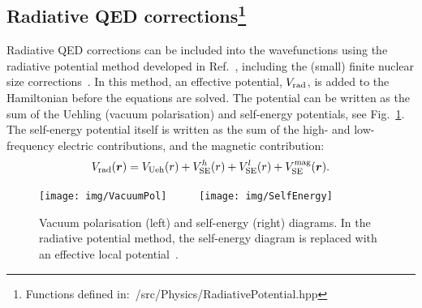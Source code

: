 \documentclass[10pt,twocolumn,a4paper]{article}%
\renewcommand{\v}[1]{\ensuremath{\boldsymbol{#1}}}		%
\newcommand{\be}{\begin{equation}}
\newcommand{\ee}{\end{equation}}
\begin{document}



\subsection[Radiative QED corrections]{Radiative QED corrections\footnote{Functions defined in:~/src/Physics/RadiativePotential.hpp}}

Radiative QED corrections can be included into the wavefunctions using the radiative potential method developed in Ref.~\cite{FlambaumQED2005}, including the (small) finite nuclear size corrections~\cite{GingesQED2015,Ginges2016}.
In this method, an effective potential, $V_{\rm rad}$,
is added to the Hamiltonian before the equations are solved.
The potential can be written as the sum of the Uehling (vacuum polarisation) and self-energy potentials, see Fig.~\ref{fig:QED}.
The self-energy potential itself is written as the sum of the high- and low-frequency electric contributions, and the magnetic contribution:
\be\label{eq:Vrad}
V_{\rm rad}(\v{r}) = V_{\rm Ueh}(r) + V_{\rm SE}^{h}(r) +  V_{\rm SE}^{l}(r) + V_{\rm SE}^{\rm mag}(\v{r}).
\ee



\begin{figure}%
\centering\tiny
\texttt{[image: img/VacuumPol]}~~~~~
\texttt{[image: img/SelfEnergy]}
\caption{\small Vacuum polarisation (left) and self-energy (right) diagrams. In the radiative potential method, the self-energy diagram is replaced with an effective local potential~\cite{FlambaumQED2005}.\label{fig:QED}}
\end{figure}
\end{document}
